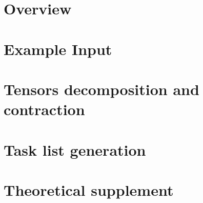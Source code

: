 \documentclass[12pt]{report}
\begin{document}
\tableofcontents

\chapter*{Overview}


\chapter{Example Input}


\chapter{Tensors decomposition and contraction}


\chapter{Task list generation}


\chapter{Theoretical supplement}


{}

\end{document}
